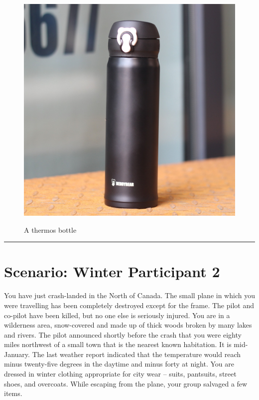 \documentclass{article}
\begin{document}
    \begin{figure}[H]
        \centering
        \begin{minipage}{0.25\textwidth}
            \centering
            \includegraphics[width=\textwidth]{../SurvivalItemImages/thermos}
        \end{minipage}\hfill
        \begin{minipage}{0.7\textwidth}
            \centering
            \Large A thermos bottle
        \end{minipage}
    \end{figure}
    \vspace{-0.8em}
    \noindent\rule{\textwidth}{0.4pt}
            
    \clearpage
    \section*{Scenario: \textmd{Winter} \hfill Participant \textmd{2}}
    \Large You have just crash-landed in the North of Canada. The small plane in which you were travelling has been completely destroyed except for the frame. The pilot and co-pilot have been killed, but no one else is seriously injured.
You are in a wilderness area, snow-covered and made up of thick woods broken by many lakes and rivers. The pilot announced shortly before the crash that you were eighty miles northwest of a small town that is the nearest known habitation. It is mid-January. The last weather report indicated that the temperature would reach minus twenty-five degrees in the daytime and minus forty at night. You are dressed in winter clothing appropriate for city wear – suits, pantsuits, street shoes, and overcoats. While escaping from the plane, your group salvaged a few items.
\clearpage
        
\end{document}
